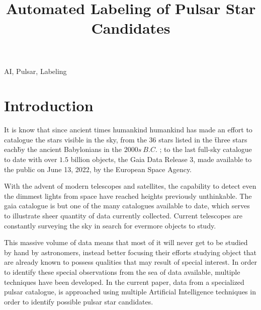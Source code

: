\documentclass[conference]{IEEEtran}
\begin{document}
\title{Automated Labeling of Pulsar Star Candidates}

\author{
    }

\maketitle

\begin{abstract}
    \todo{}
\end{abstract}

\begin{IEEEkeywords}
    AI, Pulsar, Labeling
\end{IEEEkeywords}

\section{Introduction\label{sec:intro}}
It is know that since ancient times humankind humankind has made an effort to
catalogue the stars visible in the sky, from the $36$ stars listed in the
\"three stars each\" by the ancient Babylonians in the $2000s\ B.C.$
\cite{astronomy:history:north}; to the last full-sky catalogue to date with over
$1.5$ billion objects, the Gaia Data Release 3\cite{gaia:dr3:esa}, made available
to the public on June 13, 2022, by the European Space Agency.

With the advent of modern telescopes and satellites, the capability to detect
even the dimmest lights from space have reached heights previously unthinkable.
The gaia catalogue is but one of the many catalogues available to date, which
serves to illustrate sheer quantity of data currently collected. Current
telescopes are constantly surveying the sky in search for evermore objects to study.

This massive volume of data means that most of it will never get to be studied
by hand by astronomers, instead better focusing their efforts studying object
that are already known to possess qualities that may result of special interest.
In order to identify these special observations from the sea of data available,
multiple techniques have been developed.\cite{pulsar:dataset:explanation:lyon} In the
current paper, data from a specialized pulsar catalogue\cite{pulsar:dataset:lyon},
is approached using multiple Artificial Intelligence techniques in order to
identify possible pulsar star candidates.
\end{document}
